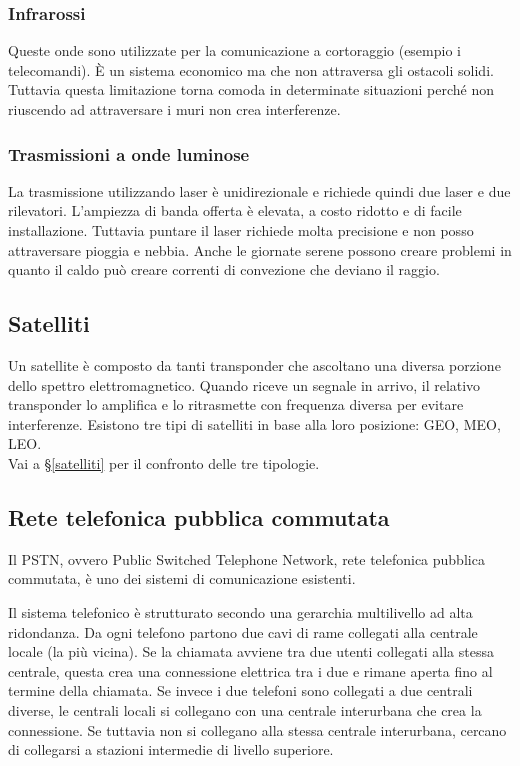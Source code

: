 \subsubsection{Infrarossi}
Queste onde sono utilizzate per la comunicazione a cortoraggio (esempio i telecomandi).
\`E un sistema economico ma che non attraversa gli ostacoli solidi.
Tuttavia questa limitazione torna comoda in determinate situazioni perché non riuscendo ad attraversare i muri non crea interferenze.

\subsubsection{Trasmissioni a onde luminose}
La trasmissione utilizzando laser è unidirezionale e richiede quindi due laser e due rilevatori.
L'ampiezza di banda offerta è elevata, a costo ridotto e di facile installazione.
Tuttavia puntare il laser richiede molta precisione e non posso attraversare pioggia e nebbia.
Anche le giornate serene possono creare problemi in quanto il caldo può creare correnti di convezione che deviano il raggio.

\subsection{Satelliti}

Un satellite è composto da tanti transponder che ascoltano una diversa porzione dello spettro elettromagnetico.
Quando riceve un segnale in arrivo, il relativo transponder lo amplifica e lo ritrasmette con frequenza diversa per evitare interferenze.
Esistono tre tipi di satelliti in base alla loro posizione: GEO, MEO, LEO.\\
Vai a §\ref{satelliti} per il confronto delle tre tipologie.

\subsection{Rete telefonica pubblica commutata}
Il PSTN, ovvero Public Switched Telephone Network, rete telefonica pubblica commutata, è uno dei sistemi di comunicazione esistenti. 

Il sistema telefonico è strutturato secondo una gerarchia multilivello ad alta ridondanza.
Da ogni telefono partono due cavi di rame collegati alla centrale locale (la più vicina). 
Se la chiamata avviene tra due utenti collegati alla stessa centrale, questa crea una connessione elettrica tra i due e rimane aperta fino al termine della chiamata.
Se invece i due telefoni sono collegati a due centrali diverse, le centrali locali si collegano con una centrale interurbana che crea la connessione. 
Se tuttavia non si collegano alla stessa centrale interurbana, cercano di collegarsi a stazioni intermedie di livello superiore.

